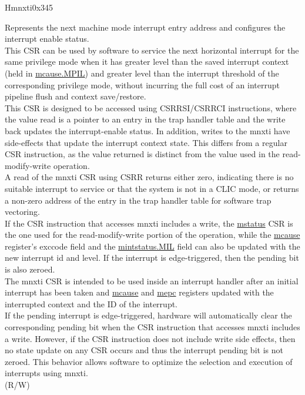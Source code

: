 \begin{register}{H}{mnxti}{0x345}\label{regdesc:MNXTI_REG}
%
\regnewline%
\begin{regdesc}\begin{reglist}
\label{fielddesc:MNXTI}\item [MNXTI]
Represents the next machine mode interrupt entry address and configures the interrupt enable status.\\
This CSR can be used by software to service the next horizontal interrupt for the same privilege mode when it has greater level than the saved interrupt context (held in \hyperref[fielddesc:MCAUSE_MPIL]{{mcause.MPIL}}) and greater level than the interrupt threshold of the corresponding privilege mode, without incurring the full cost of an interrupt pipeline flush and context save/restore.\\
This CSR is designed to be accessed using CSRRSI/CSRRCI instructions, where the value read is a pointer to an entry in the trap handler table and the write back updates the interrupt-enable status. In addition, writes to the mnxti have side-effects that update the interrupt context state. This differs from a regular CSR instruction, as the value returned is distinct from the value used in the read-modify-write operation.\\
A read of the mnxti CSR using CSRR returns either zero, indicating there is no suitable interrupt to service or that the system is not in a CLIC mode, or returns a non-zero address of the entry in the trap handler table for software trap vectoring.\\
If the CSR instruction that accesses mnxti includes a write, the \hyperref[regdesc:MSTATUS]{mstatus} CSR is the one used for the read-modify-write portion of the operation, while the \hyperref[regdesc:MCAUSE]{mcause} register’s exccode field and the \hyperref[fielddesc:MINTSTATUS_MIL]{mintstatus.MIL} field can also be updated with the new interrupt id and level. If the interrupt is edge-triggered, then the pending bit is also zeroed.\\
The mnxti CSR is intended to be used inside an interrupt handler after an initial interrupt has been taken and \hyperref[regdesc:MCAUSE]{mcause} and \hyperref[regdesc:MEPC]{mepc} registers updated with the interrupted context and the ID of the interrupt. \\
If the pending interrupt is edge-triggered, hardware will automatically clear the corresponding pending bit when the CSR instruction that accesses mnxti includes a write. However, if the CSR instruction does not include write side effects, then no state update on any CSR occurs and thus the interrupt pending bit is not zeroed. This behavior allows software to optimize the selection and execution of interrupts using mnxti.\\
(R/W)
\end{reglist}\end{regdesc}
\end{register}

